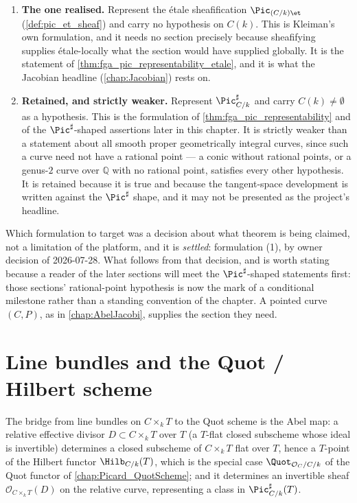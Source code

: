 \begin{enumerate}
  \item \textbf{The one realised.} Represent the \'etale sheafification
    \(\Pic_{(C/k)\et}\) (\cref{def:pic_et_sheaf}) and carry no hypothesis on
    \(C(k)\). This is Kleiman's own formulation, and it needs no section
    precisely because sheafifying supplies \'etale-locally what the section
    would have supplied globally. It is the statement of
    \cref{thm:fga_pic_representability_etale}, and it is what the Jacobian
    headline (\cref{chap:Jacobian}) rests on.
  \item \textbf{Retained, and strictly weaker.} Represent
    \(\Pic^\sharp_{C/k}\) and carry \(C(k) \neq \emptyset\) as a hypothesis.
    This is the formulation of \cref{thm:fga_pic_representability} and of the
    \(\Pic^\sharp\)-shaped assertions later in this chapter. It is strictly
    weaker than a statement about all smooth proper geometrically integral
    curves, since such a curve need not have a rational point --- a conic
    without rational points, or a genus-\(2\) curve over \(\mathbb{Q}\) with no
    rational point, satisfies every other hypothesis. It is retained because it
    is true and because the tangent-space development is written against the
    \(\Pic^\sharp\) shape, and it may not be presented as the project's
    headline.
\end{enumerate}

Which formulation to target was a decision about what theorem is being claimed,
not a limitation of the platform, and it is \emph{settled}: formulation (1), by
owner decision of 2026-07-28. What follows from that decision, and is worth
stating because a reader of the later sections will meet the
\(\Pic^\sharp\)-shaped statements first: those sections' rational-point
hypothesis is now the mark of a conditional milestone rather than a standing
convention of the chapter. A pointed curve \((C,P)\), as in
\cref{chap:AbelJacobi}, supplies the section they need.


\section{Line bundles and the Quot / Hilbert scheme}
\label{sec:fga_pic_line_bundle_quot}

The bridge from line bundles on \(C \times_k T\) to the Quot scheme is the
Abel map: a relative effective divisor \(D \subset C \times_k T\) over \(T\)
(a \(T\)-flat closed subscheme whose ideal is invertible) determines a closed
subscheme of \(C \times_k T\) flat over \(T\), hence a \(T\)-point of the Hilbert
functor \(\Hilb_{C/k}(T)\), which is the special case \(\Quot_{\mathcal{O}_C/C/k}\)
of the Quot functor of \cref{chap:Picard_QuotScheme}; and it determines an
invertible sheaf \(\mathcal{O}_{C \times_k T}(D)\) on the relative curve,
representing a class in \(\Pic^\sharp_{C/k}(T)\).

